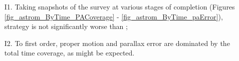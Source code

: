 
\begin{itemize}
  \item[I1.] Taking snapshots of the survey at various stages of completion (Figures \ref{fig_astrom_ByTime_PACoverage} -  \ref{fig_astrom_ByTime_paError}), strategy  is not significantly worse than ;
\item[I2.] To first order, proper motion and parallax error are dominated by the total time coverage, as might be expected. 
\end{itemize}

